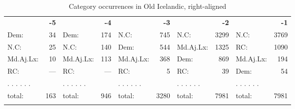 \documentclass[output=paper,colorlinks,citecolor=brown,draft]{langscibook}
\begin{document}
\begin{table}
\caption{Category occurrences in Old Icelandic, right-aligned }
\label{tab:prob2} \small 
%
%
  \begin{tabularx}{\textwidth}{X@{}r X@{}r X@{}r l@{}r X@{}r }
  \lsptoprule

    &\textbf{-5} && \textbf{-4} && \textbf{-3} && \textbf{-2} &&\textbf{-1} \\
    \cmidrule(lr){1-2}\cmidrule(lr){3-4}\cmidrule(lr){5-6}\cmidrule(lr){7-8}\cmidrule(lr){9-10}
Dem:&  34 & Dem:&  174 & N.C:&  745 & N.C:&  3299 &  N.C:&  3769  \\
    N.C:&  25 & N.C:&  140 & Dem:&  544 & Md.Aj.Lx:& \hspace{0.15mm}1325 & RC:&  1090   \\
    Md.Aj.Lx:&  10 & Md.Aj.Lx:&  113 & Md.Aj.Lx:& \hspace{0.15mm}368 & Dem:&  869 & {\small Md.Aj.Lx}:& \hspace{0.15mm}194   \\
    RC:&  ---  & RC:&  --- & RC:&  5  & RC:&  39  &  Dem:&  54  \\
    . . . . . .  &&  . . . . . .  && . . . . . . && . . . . . . && . . . . . .\\
    \cmidrule(lr){1-2}\cmidrule(lr){3-4}\cmidrule(lr){5-6}\cmidrule(lr){7-8}\cmidrule(lr){9-10}
total:&  163  & total:&  946 & total:&  3280 & total:&  7981 &  total:&  7981   \\

   \lspbottomrule
 \end{tabularx}
\end{table}
\end{document}
